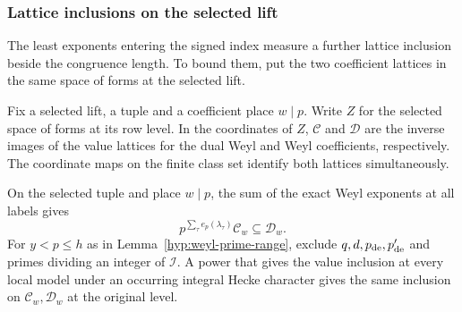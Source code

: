 \subsubsection{Lattice inclusions on the selected lift}\label{subsec:lift-exponent-models}
\hypertarget{source-lift-exponent-models}{}

The least exponents entering the signed index measure a further lattice inclusion beside the congruence length. To bound them, put the two coefficient lattices in the same space of forms at the selected lift.

Fix a selected lift, a tuple and a coefficient place \(w\mid p\).
Write \(Z\) for the selected space of forms at its row level.
In the coordinates of \(Z\), \(\mathcal C\) and \(\mathcal D\)
are the inverse images of the value lattices for the dual Weyl
and Weyl coefficients, respectively. The coordinate maps on
the finite class set identify both lattices simultaneously.
\begin{proposition}
\label{prop:local-weyl-value-inclusion}
On the selected tuple and place \(w\mid p\), the sum of the exact Weyl exponents at all labels gives
\[
 p^{\sum_\tau e_p(\lambda_\tau)}\mathcal C_w\subseteq\mathcal D_w.
\]
For \(y<p\le h\) as in Lemma~\ref{hyp:weyl-prime-range},
exclude \(q,d,p_{\rm de},p'_{\rm de}\) and primes dividing an
integer of \(\mathcal I\). A power that gives the value inclusion at every local model under
an occurring integral Hecke character gives the same inclusion on
\(\mathcal C_w,\mathcal D_w\) at the original level.
\end{proposition}

